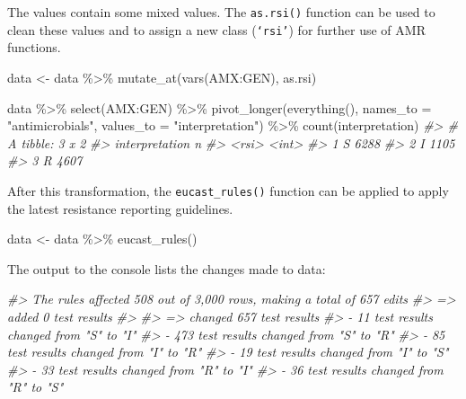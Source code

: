 \documentclass[
]{book}
\newenvironment{Shaded}{\begin{snugshade}}{\end{snugshade}}
\newcommand{\AttributeTok}[1]{\textcolor[rgb]{0.77,0.63,0.00}{#1}}
\newcommand{\CommentTok}[1]{\textcolor[rgb]{0.56,0.35,0.01}{\textit{#1}}}
\newcommand{\FunctionTok}[1]{\textcolor[rgb]{0.00,0.00,0.00}{#1}}
\newcommand{\NormalTok}[1]{#1}
\newcommand{\OtherTok}[1]{\textcolor[rgb]{0.56,0.35,0.01}{#1}}
\newcommand{\SpecialCharTok}[1]{\textcolor[rgb]{0.00,0.00,0.00}{#1}}
\newcommand{\StringTok}[1]{\textcolor[rgb]{0.31,0.60,0.02}{#1}}
\begin{document}
The values contain some mixed values. The \texttt{as.rsi()} function can be used to clean these values and to assign a new class (\texttt{‘rsi’}) for further use of AMR functions.

\begin{Shaded}
\begin{Highlighting}[]
\NormalTok{data }\OtherTok{\textless{}{-}}\NormalTok{ data }\SpecialCharTok{\%\textgreater{}\%}
  \FunctionTok{mutate\_at}\NormalTok{(}\FunctionTok{vars}\NormalTok{(AMX}\SpecialCharTok{:}\NormalTok{GEN), as.rsi)}

\NormalTok{data }\SpecialCharTok{\%\textgreater{}\%}
  \FunctionTok{select}\NormalTok{(AMX}\SpecialCharTok{:}\NormalTok{GEN) }\SpecialCharTok{\%\textgreater{}\%}
  \FunctionTok{pivot\_longer}\NormalTok{(}\FunctionTok{everything}\NormalTok{(),}
               \AttributeTok{names\_to =} \StringTok{"antimicrobials"}\NormalTok{,}
               \AttributeTok{values\_to =} \StringTok{"interpretation"}\NormalTok{) }\SpecialCharTok{\%\textgreater{}\%}
  \FunctionTok{count}\NormalTok{(interpretation)}
\CommentTok{\#\textgreater{} \# A tibble: 3 x 2}
\CommentTok{\#\textgreater{}   interpretation     n}
\CommentTok{\#\textgreater{}   \textless{}rsi\textgreater{}          \textless{}int\textgreater{}}
\CommentTok{\#\textgreater{} 1   S             6288}
\CommentTok{\#\textgreater{} 2   I             1105}
\CommentTok{\#\textgreater{} 3   R             4607}
\end{Highlighting}
\end{Shaded}

After this transformation, the \texttt{eucast\_rules()} function can be applied to apply the latest resistance reporting guidelines.

\begin{Shaded}
\begin{Highlighting}[]
\NormalTok{data }\OtherTok{\textless{}{-}}\NormalTok{ data }\SpecialCharTok{\%\textgreater{}\%}
  \FunctionTok{eucast\_rules}\NormalTok{()}
\end{Highlighting}
\end{Shaded}

The output to the console lists the changes made to data:

\begin{Shaded}
\begin{Highlighting}[]
\CommentTok{\#\textgreater{} The rules affected 508 out of 3,000 rows, making a total of 657 edits}
\CommentTok{\#\textgreater{} =\textgreater{} added 0 test results}
\CommentTok{\#\textgreater{} }
\CommentTok{\#\textgreater{} =\textgreater{} changed 657 test results}
\CommentTok{\#\textgreater{} {-} 11 test results changed from "S" to "I"}
\CommentTok{\#\textgreater{} {-} 473 test results changed from "S" to "R"}
\CommentTok{\#\textgreater{} {-} 85 test results changed from "I" to "R"}
\CommentTok{\#\textgreater{} {-} 19 test results changed from "I" to "S"}
\CommentTok{\#\textgreater{} {-} 33 test results changed from "R" to "I"}
\CommentTok{\#\textgreater{} {-} 36 test results changed from "R" to "S"}
\end{Highlighting}
\end{Shaded}
\end{document}
